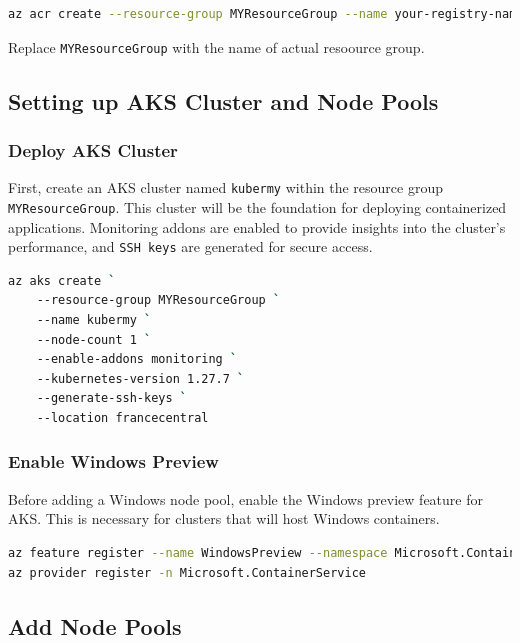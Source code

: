 \documentclass{article}
\begin{document}
\begin{lstlisting}[language=bash]
az acr create --resource-group MYResourceGroup --name your-registry-name --sku Basic --admin-enabled true
\end{lstlisting}

Replace \texttt{MYResourceGroup} with the name of actual resoource group.



\subsection{Setting up AKS Cluster and Node Pools}  

\subsubsection{Deploy AKS Cluster}

First, create an AKS cluster named \texttt{kubermy} within the resource group \texttt{MYResourceGroup}. This cluster will be the foundation for deploying containerized applications. Monitoring addons are enabled to provide insights into the cluster's performance, and \texttt{SSH keys} are generated for secure access. 

\begin{lstlisting}[language=bash]
az aks create `
    --resource-group MYResourceGroup `
    --name kubermy `
    --node-count 1 `
    --enable-addons monitoring `
    --kubernetes-version 1.27.7 `
    --generate-ssh-keys `
    --location francecentral
\end{lstlisting}

\subsubsection{Enable Windows Preview}

Before adding a Windows node pool, enable the Windows preview feature for AKS. This is necessary for clusters that will host Windows containers.

\begin{lstlisting}[language=bash]
az feature register --name WindowsPreview --namespace Microsoft.ContainerService
az provider register -n Microsoft.ContainerService
\end{lstlisting}

\subsection{Add Node Pools} 
\end{document}
